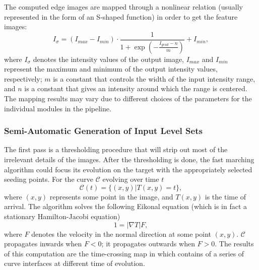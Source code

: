 The computed edge images are mapped through a nonlinear relation (usually represented in the form of an S-shaped function) in order to get the feature images:
\begin{equation}
\label{eqn:Sigmoid}
I_{\sigma} = (I_{max} - I_{min}) \cdot \frac{1}{1 + \exp\left(-\frac{I_{grad} - n}{m}\right)} + I_{min},
\end{equation}
where $I_{\sigma}$ denotes the intensity values of the output image, $I_{max}$ and $I_{min}$ represent the maximum and minimum of the output intensity values, respectively; $m$ is a constant that controls the width of the input intensity range, and $n$ is a constant that gives an intensity around which the range is centered.
The mapping results may vary due to different choices of the parameters for the individual modules in the pipeline.

\subsubsection{Semi-Automatic Generation of Input Level Sets}

The first pass is a thresholding procedure that will strip out most of the irrelevant details of the images.
After the thresholding is done, the fast marching algorithm \cite{Sethian1999} could focus its evolution on the target with the appropriately selected seeding points.
For the curve $\mathcal{C}$ evolving over time $t$
\begin{equation}
\label{eqn:Curves}
\mathcal{C}(t) = \{(x,y) | T(x,y) = t\},
\end{equation}
where $(x,y)$ represents some point in the image, and $T(x,y)$ is the time of arrival.
The algorithm solves the following Eikonal equation (which is in fact a stationary Hamilton-Jacobi equation)
\begin{equation}
1 = | \nabla T | F,
\end{equation}
where $F$ denotes the velocity in the normal direction at some point $(x,y)$.
$\mathcal{C}$ propagates inwards when $F < 0$; it propagates outwards when $F > 0$.
The results of this computation are the time-crossing map in which contains of a series of curve interfaces at different time of evolution.

